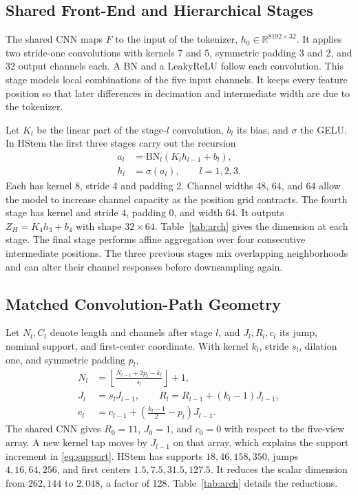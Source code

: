 \documentclass[journal]{IEEEtran}
\begin{document}
\subsection{Shared Front-End and Hierarchical Stages}
The shared CNN maps \(F\) to the input of the tokenizer, \(h_0\in\mathbb R^{8192\times32}\). It applies two stride-one convolutions with kernels 7 and 5, symmetric padding 3 and 2, and 32 output channels each. A BN and a LeakyReLU follow each convolution. This stage models local combinations of the five input channels. It keeps every feature position so that later differences in decimation and intermediate width are due to the tokenizer.

Let \(K_l\) be the linear part of the stage-\(l\) convolution, \(b_l\) its bias, and \(\sigma\) the GELU. In HStem the first three stages carry out the recursion
\begin{align}
 a_l&=\mathrm{BN}_l(K_l h_{l-1}+b_l),\\
 h_l&=\sigma(a_l),\qquad l=1,2,3 .
 \label{eq:stem}
\end{align}
Each has kernel 8, stride 4 and padding 2. Channel widths 48, 64, and 64 allow the model to increase channel capacity as the position grid contracts. The fourth stage has kernel and stride 4, padding 0, and width 64. It outputs \(Z_H=K_4h_3+b_4\) with shape \(32\times64\). Table~\ref{tab:arch} gives the dimension at each stage. The final stage performs affine aggregation over four consecutive intermediate positions. The three previous stages mix overlapping neighborhoods and can alter their channel responses before downsampling again.

\subsection{Matched Convolution-Path Geometry}
Let \(N_l,C_l\) denote length and channels after stage \(l\), and \(J_l,R_l,c_l\) its jump, nominal support, and first-center coordinate. With kernel \(k_l\), stride \(s_l\), dilation one, and symmetric padding \(p_l\),
\begin{align}
 N_l&=\left\lfloor\frac{N_{l-1}+2p_l-k_l}{s_l}\right\rfloor+1,\\
 J_l&=s_lJ_{l-1},\qquad R_l=R_{l-1}+(k_l-1)J_{l-1},\\
 c_l&=c_{l-1}+\left(\frac{k_l-1}{2}-p_l\right)J_{l-1}.
 \label{eq:support}
\end{align}
The shared CNN gives \(R_0=11\), \(J_0=1\), and \(c_0=0\) with respect to the five-view array. A new kernel tap moves by \(J_{l-1}\) on that array, which explains the support increment in \eqref{eq:support}. HStem has supports \(18,46,158,350\), jumps \(4,16,64,256\), and first centers \(1.5,7.5,31.5,127.5\). It reduces the scalar dimension from \(262{,}144\) to \(2{,}048\), a factor of 128. Table~\ref{tab:arch} details the reductions.
\end{document}
